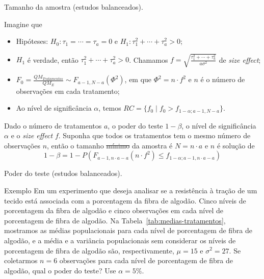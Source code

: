 \documentclass[8pt]{beamer}
\begin{document}
\begin{frame}{Tamanho da amostra (estudos balanceados).}

Imagine que
\begin{itemize}
	\item Hipóteses: $H_0: \tau_1=\cdots=\tau_a=0$ e $H_1: \tau_1^2 + \cdots + \tau_a^2 > 0$;
	\item $H_1$ é verdade, então $\tau_1^2 + \cdots + \tau_a^2 > 0$. Chamamos $f = \sqrt{\frac{\tau_1^2 + \cdots + \tau_a^2}{a \sigma^2}}$ de \textit{size effect};
	\item $F_0 = \frac{QM_{Tratamentos}}{QM_E} \sim F_{a-1, N-a}\left(\Phi^2\right)$, em que $\Phi^2 = n \cdot f^2$ e $n$ é o número de observações em cada tratamento;
	\item Ao nível de significância $\alpha$, temos $RC = \{ f_0 \mid f_0 > f_{1-\alpha;a-1, N-a}  \}$.
\end{itemize}

Dado o número de tratamentos $a$, o poder do teste $1-\beta$, o nível de significância $\alpha$ e o \textit{size effect} $f$. Suponha que todos os tratamentos tem o mesmo número de observações $n$, então o tamanho \sout{mínimo} da amostra é $N= n\cdot a$ e $n$ é solução de
$$1-\beta = 1 - P\left( F_{a-1, n\cdot a-a}\left(n\cdot f^2\right) \leq f_{1-\alpha;a-1, n\cdot a - a} \right)$$

\end{frame}

\begin{frame}{Poder do teste (estudos balanceados).}


\begin{block}{Exemplo}
	Em um experimento que deseja analisar se a resistência à tração de um tecido está associada com a porcentagem da fibra de algodão. Cinco níveis de porcentagem da fibra de algodão e cinco observações em cada nível de porcentagem de fibra de algodão. Na Tabela~\ref{tab:medias-tratamentos}, mostramos as médias populacionais para cada nível de porcentagem de fibra de algodão, e a média e a variância populacionais sem considerar os níveis de porcentagem de fibra de algodão são, respectivamente, $\mu = 15$ e $\sigma^2 = 27$. Se coletarmos $n=6$ observações para cada nível de porcentagem de fibra de algodão, qual o poder do teste? Use $\alpha = 5\%$. 
	\begin{table}[ht]
		\centering
		\caption{Médias para cada nível de porcentagem de fibra de algodão.} 
		\label{tab:medias-tratamentos}
	\end{table}
\end{block}

\end{frame}
\end{document}
